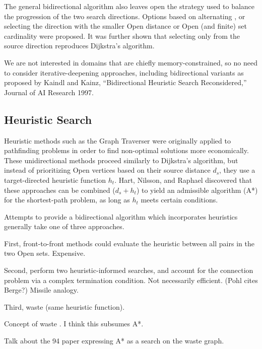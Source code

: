The general bidirectional algorithm also leaves open the strategy
used to balance the progression of the two search directions.
Options based on alternating \citep{dantzig1963linearprogramming},
or selecting the direction with the smaller {\sc Open} distance
\citep{nicholson1966shortest}
or {\sc Open} (and finite) set cardinality
\citep{pohl1969bidirectional}
were proposed.
It was further shown that selecting only from the source direction
reproduces Dijkstra's algorithm.

We are not interested in domains that are chiefly memory-constrained,
so no need to consider iterative-deepening approaches,
including bidirectional variants as proposed by
Kaindl and Kainz, ``Bidirectional Heuristic Search Reconsidered,''
Journal of AI Research 1997.

\subsection{Heuristic Search}

Heuristic methods such as the Graph Traverser
\citep{doran1966graphtraverser} were originally
applied to pathfinding problems in order to find non-optimal
solutions more economically.
These unidirectional methods proceed similarly to Dijkstra's algorithm,
but instead of prioritizing {\sc Open} vertices
based on their source distance $d_s$,
they use a target-directed heuristic function $h_t$.
Hart, Nilsson, and Raphael \citep{hart1968astar} discovered that
these approaches can be combined ($d_s + h_t$) to yield
an admissible algorithm (A*) for the shortest-path problem,
as long as $h_t$ meets certain conditions.

Attempts to provide a bidirectional algorithm which incorporates
heuristics generally take one of three approaches.

First,
front-to-front methods
could evaluate the heuristic between all pairs in the two
{\sc Open} sets.
Expensive.

Second,
perform two heuristic-informed searches,
and account for the connection problem via a complex
termination condition.
Not necessarily efficient.
(Pohl cites Berge?)
Missile analogy.

Third,
waste (same heuristic function).

Concept of waste \citep{pohl1969bidirectional}.
I think this subsumes A*.

Talk about the 94 paper \citep{ikeda1994betterroutes}
expressing A* as a search on
the waste graph.

